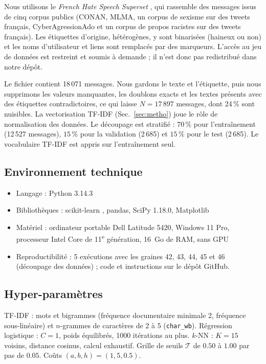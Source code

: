 \documentclass[a4paper,fleqn]{cas-sc}
\begin{document}
Nous utilisons le \textit{French Hate Speech Superset} \citep{Tonneau2024}, qui rassemble des messages
issus de cinq corpus publics (CONAN, MLMA, un corpus de sexisme sur des tweets français,
CyberAgressionAdo et un corpus de propos racistes sur des tweets français). Les étiquettes d'origine,
hétérogènes, y sont binarisées (haineux ou non) et les noms d'utilisateur et liens sont remplacés par des
marqueurs. L'accès au jeu de données est restreint et soumis à demande ; il n'est donc pas redistribué
dans notre dépôt.

Le fichier contient 18\,071 messages. Nous gardons le texte et l'étiquette, puis nous supprimons les
valeurs manquantes, les doublons exacts et les textes présents avec des étiquettes contradictoires, ce
qui laisse $N=17\,897$ messages, dont 24\,\% sont nuisibles. La vectorisation TF-IDF (Sec.~\ref{sec:metho}) joue
le rôle de normalisation des données. Le découpage est stratifié : $70\,\%$ pour l'entraînement
(12\,527 messages), $15\,\%$ pour la validation (2\,685) et $15\,\%$ pour le test (2\,685). Le vocabulaire
TF-IDF est appris sur l'entraînement seul.

\subsection{Environnement technique}

\begin{itemize}
    \item Langage : Python 3.14.3
    \item Bibliothèques : scikit-learn \citep{Pedregosa2011}, pandas, SciPy 1.18.0, Matplotlib %
    \item Matériel : ordinateur portable Dell Latitude 5420, Windows 11 Pro, processeur Intel Core de 11\textsuperscript{e} génération, 16~Go de RAM, sans GPU %
    \item Reproductibilité : 5 exécutions avec les graines 42, 43, 44, 45 et 46 (découpage des données) ; code et instructions sur le dépôt GitHub.
\end{itemize}

\subsection{Hyper-paramètres}

TF-IDF : mots et bigrammes (fréquence documentaire minimale 2, fréquence sous-linéaire) et $n$-grammes de
caractères de 2 à 5 (\texttt{char\_wb}). Régression logistique : $C=1$, poids équilibrés, 1000 itérations
au plus. $k$-NN : $K=15$ voisins, distance cosinus, calcul exhaustif. Grille de seuils $\mathcal{T}$ de $0.50$ à
$1.00$ par pas de $0.05$. Coûts $(a,b,h)=(1,5,0.5)$.
\end{document}

